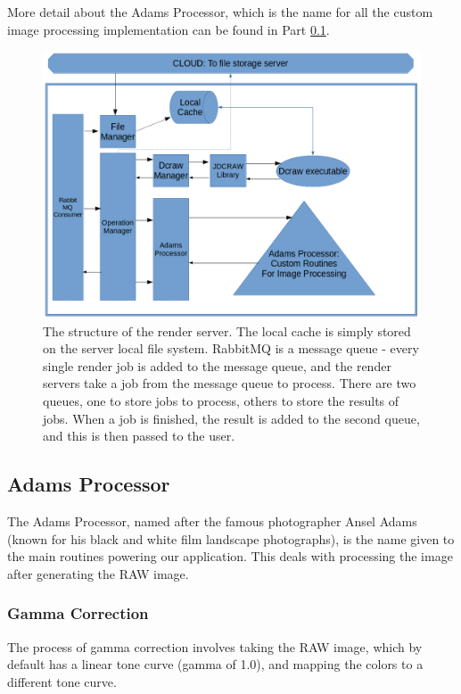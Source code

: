 \documentclass[10pt,a4paper]{article}
\begin{document}
More detail about the Adams Processor, which is the name for all the custom image processing implementation can be found in Part \ref{AdamsProcessor}.
\begin{figure}
    \includegraphics[width=\linewidth]{renderserverdiagram}
    \caption{The structure of the render server. The local cache is simply stored on the server local file system.
    RabbitMQ is a message queue - every single render job is added to the message queue, and the render servers take a job from the message queue
    to process. There are two queues, one to store jobs to process, others to store the results of jobs. When a job is finished, the result is added to the second
    queue, and this is then passed to the user.}
    \label{renderserverdiagram}
\end{figure}

\subsection{Adams Processor}\label{AdamsProcessor}
The Adams Processor, named after the famous photographer Ansel Adams (known for his black and white film landscape photographs), 
is the name given to the main routines powering our application. This deals with processing the image after generating the RAW image.
\subsubsection{Gamma Correction}
The process of gamma correction involves taking the RAW image, which by default has a linear tone curve (gamma of 1.0), and
mapping the colors to a different tone curve.
\end{document}
